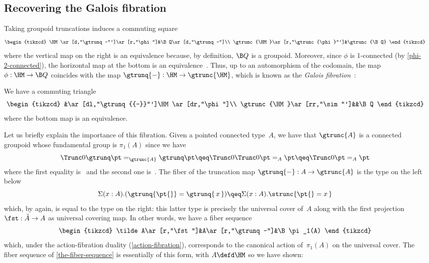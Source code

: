 \documentclass[a4paper]{article}
\newcommand{\citep}{\cite}
\begin{document}
\subsection{Recovering the Galois fibration}
\label{galois-fibration}
Taking groupoid truncations induces a commuting square
\[
  \begin{tikzcd}
    \HM\ar[d,"\gtrunq-"']\ar[r,"\phi"]&\B Q\ar[d,"\gtrunq-"]\\
    \gtrunc{\HM}\ar[r,"\gtrunc{\phi}"']&\gtrunc{\B Q}
  \end{tikzcd}
\]
where the vertical map on the right is an equivalence because, by definition, $\B Q$ is a groupoid. Moreover, since $\phi$ is 1-connected (by \cref{phi-2-connected}), the horizontal map at the bottom is an equivalence~\cite[Lemma 7.5.14]{hottbook}. Thus, up to an automorphism of the codomain, the map $\phi:\HM\to\B Q$ coincides with the map $\gtrunq{{-}}:\HM\to\gtrunc{\HM}$, which is known as the \emph{Galois fibration}~\citep{galoisfib}:

\begin{lemma}
  \label{phi-galois}
  We have a commuting triangle
  \[
    \begin{tikzcd}
      &\ar[dl,"\gtrunq{{-}}"']\HM\ar[dr,"\phi"]\\
      \gtrunc{\HM}\ar[rr,"\sim"']&&\B Q
    \end{tikzcd}
  \]
  where the bottom map is an equivalence.
\end{lemma}

Let us briefly explain the importance of this fibration. Given a pointed connected type~$A$, we have that $\gtrunc{A}$ is a connected groupoid whose fundamental group is $\pi_1(A)$ since we have
\[
  \Trunc0{\gtrunq\pt=_{\gtrunc{A}}\gtrunq\pt}
  \qeq
  \Trunc0{\Trunc0{\pt=_A\pt}}
  \qeq
  \Trunc0{\pt=_A\pt}
\]
where the first equality is~\cite[Theorem 7.3.12]{hottbook} and the second one is~\cite[Corollary 7.3.7]{hottbook}. The fiber of the truncation map $\gtrunq{{-}}:A\to\gtrunc{A}$ is the type on the left below
\[
  \Sigma(x:A).(\gtrunq{\pt{}}=\gtrunq{\,x\,})
  \qeq
  \Sigma(x:A).\strunc{\pt{}=x\,}
\]
which, by \cite[Theorem 7.3.12]{hottbook} again, is equal to the type on the right: this latter type is precisely the universal cover of~$A$ along with the first projection $\fst:\tilde A\to A$ as universal covering map. In other words, we have a fiber sequence
\[
  \begin{tikzcd}
    \tilde A\ar[r,"\fst"]&A\ar[r,"\gtrunq-"]&\B\pi_1(A)
  \end{tikzcd}
\]
which, under the action-fibration duality (\cref{action-fibration}), corresponds to the canonical action of~$\pi_1(A)$ on the universal cover.
%
The fiber sequence of \cref{the-fiber-sequence} is essentially of this form, with $A\defd\HM$ so we have shown:
\end{document}
